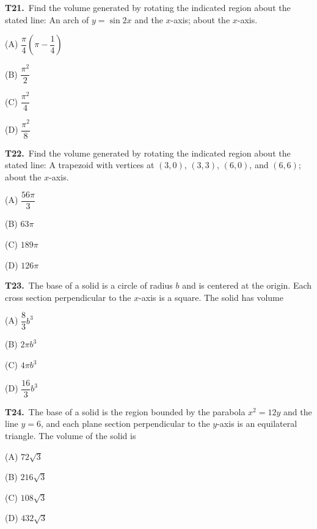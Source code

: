 \documentclass[11pt]{article}
\begin{document}
\bigskip\noindent\textbf{T21.}\ Find the volume generated by rotating the indicated region about the stated line: An arch of $y=\sin 2x$ and the $x$-axis; about the $x$-axis.
\begin{list}{}{\setlength{\leftmargin}{3em}\setlength{\labelwidth}{2.5em}\setlength{\itemsep}{0pt}\setlength{\topsep}{2pt}}
\item[(A)] $\dfrac{\pi}{4}\left(\pi-\dfrac{1}{4}\right)$
\item[(B)] $\dfrac{\pi^2}{2}$
\item[(C)] $\dfrac{\pi^2}{4}$
\item[(D)] $\dfrac{\pi^2}{8}$
\end{list}

\bigskip\noindent\textbf{T22.}\ Find the volume generated by rotating the indicated region about the stated line: A trapezoid with vertices at $(3,0)$, $(3,3)$, $(6,0)$, and $(6,6)$; about the $x$-axis.
\begin{list}{}{\setlength{\leftmargin}{3em}\setlength{\labelwidth}{2.5em}\setlength{\itemsep}{0pt}\setlength{\topsep}{2pt}}
\item[(A)] $\dfrac{56\pi}{3}$
\item[(B)] $63\pi$
\item[(C)] $189\pi$
\item[(D)] $126\pi$
\end{list}

\bigskip\noindent\textbf{T23.}\ The base of a solid is a circle of radius $b$ and is centered at the origin. Each cross section perpendicular to the $x$-axis is a square. The solid has volume
\begin{list}{}{\setlength{\leftmargin}{3em}\setlength{\labelwidth}{2.5em}\setlength{\itemsep}{0pt}\setlength{\topsep}{2pt}}
\item[(A)] $\dfrac{8}{3}b^3$
\item[(B)] $2\pi b^3$
\item[(C)] $4\pi b^3$
\item[(D)] $\dfrac{16}{3}b^3$
\end{list}

\bigskip\noindent\textbf{T24.}\ The base of a solid is the region bounded by the parabola $x^2=12y$ and the line $y=6$, and each plane section perpendicular to the $y$-axis is an equilateral triangle. The volume of the solid is
\begin{list}{}{\setlength{\leftmargin}{3em}\setlength{\labelwidth}{2.5em}\setlength{\itemsep}{0pt}\setlength{\topsep}{2pt}}
\item[(A)] $72\sqrt{3}$
\item[(B)] $216\sqrt{3}$
\item[(C)] $108\sqrt{3}$
\item[(D)] $432\sqrt{3}$
\end{list}
\end{document}
